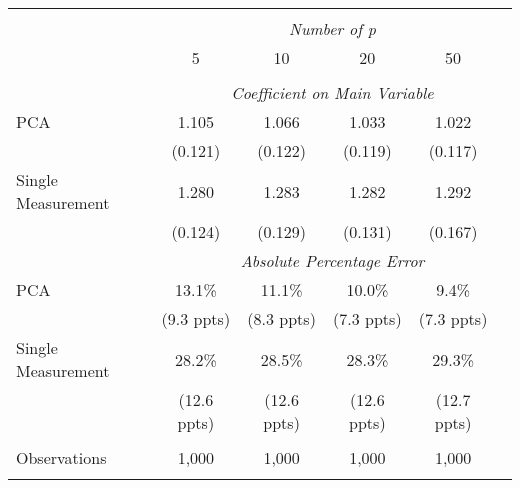\begin{table}[!htbp] \centering
\begin{tabular}{@{\extracolsep{5pt}}lccccc}
\\[-1.8ex]\hline
\hline \\[-1.8ex]
& \multicolumn{5}{c}{\textit{Number of p}} \
\cr 
\\[-1.8ex] & 5 & 10 & 20 & 50 \\
\hline \\[-1.8ex]
& \multicolumn{5}{c}{\textit{Coefficient on Main Variable}} \\
 PCA & 1.105 & 1.066 & 1.033 & 1.022  \\
  & (0.121) & (0.122) & (0.119) & (0.117)\\
  Single Measurement & 1.280 & 1.283 & 1.282 & 1.292  \\
  & (0.124) & (0.129) & (0.131) & (0.167)\\
& \multicolumn{5}{c}{\textit{Absolute Percentage Error}} \\
  PCA & 13.1\% & 11.1\% & 10.0\% & 9.4\%  \\
   & (9.3 ppts) & (8.3 ppts) & (7.3 ppts) & (7.3 ppts)\\
  Single Measurement & 28.2\% & 28.5\% & 28.3\% & 29.3\%  \\
  & (12.6 ppts) & (12.6 ppts) & (12.6 ppts) & (12.7 ppts)\\
\hline \\[-1.8ex]
 Observations & 1,000 & 1,000 & 1,000 & 1,000 & \\
\hline
\hline \\[-1.8ex]
\end{tabular}
\end{table}